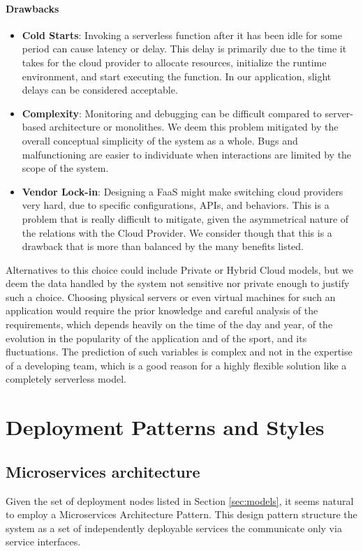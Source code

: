 \documentclass{article}
\begin{document}
\paragraph*{Drawbacks}
\begin{itemize}
    \item \textbf{Cold Starts}: Invoking a serverless function after it has been idle for some period can cause latency or delay. This delay is primarily due to the time it takes for the cloud provider to allocate resources, initialize the runtime environment, and start executing the function. In our application, slight delays can be considered acceptable.
    \item \textbf{Complexity}: Monitoring and debugging can be difficult compared to server-based architecture or monolithes. We deem this problem mitigated by the overall conceptual simplicity of the system as a whole. Bugs and malfunctioning are easier to individuate when interactions are limited by the scope of the system.
    \item \textbf{Vendor Lock-in}: Designing a FaaS might make switching cloud providers very hard, due to specific configurations, APIs, and behaviors. This is a problem that is really difficult to mitigate, given the asymmetrical nature of the relations with the Cloud Provider. We consider though that this is a drawback that is more than balanced by the many benefits listed.
\end{itemize}

Alternatives to this choice could include Private or Hybrid Cloud models, but we deem the data handled by the system not sensitive nor private enough to justify such a choice. 
Choosing physical servers or even virtual machines for such an application would require the prior knowledge and careful analysis of the requirements, which depends heavily on the time of the day and year, of the evolution in the popularity of the application and of the sport, and its fluctuations. The prediction of such variables is complex and not in the expertise of a developing team, which is a good reason for a highly flexible solution like a completely serverless model.

\section{Deployment Patterns and Styles}

\subsection{Microservices architecture}
Given the set of deployment nodes listed in Section \ref{sec:models}, it seems natural to employ a Microservices Architecture Pattern.
This design pattern structure the system as a set of independently deployable services the communicate only via service interfaces.
\end{document}
